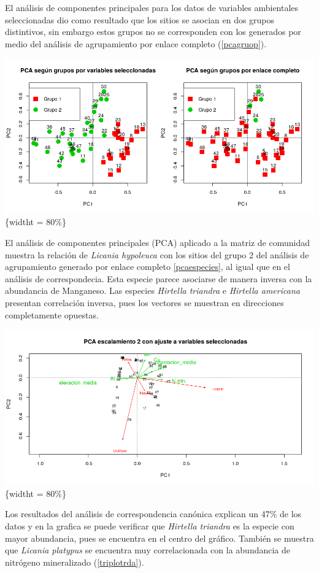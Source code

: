 \documentclass[11pt,]{article}
\begin{document}
El análisis de componentes principales para los datos de variables
ambientales seleccionadas dio como resultado que los sitios se asocian
en dos grupos distintivos, sin embargo estos grupos no se corresponden
con los generados por medio del análisis de agrupamiento por enlace
completo (\ref{pcagruop}).

\includegraphics{PCA_porgrupos.png}\{widtht = 80\%\}

El análisis de componentes principales (PCA) aplicado a la matriz de
comunidad muestra la relación de \emph{Licania hypoleuca} con los sitios
del grupo 2 del análisis de agrupamiento generado por enlace completo
\ref{pcaespecies}, al igual que en el análisis de correspondecia. Esta
especie parece asociarse de manera inversa con la abundancia de
Manganeso. Las especies \emph{Hirtella triandra} e \emph{Hirtella
americana} presentan correlación inversa, pues los vectores se muestran
en direcciones completamente opuestas.

\includegraphics{PCA_especies.png}\{widtht = 80\%\}

Los resultados del análisis de correspondencia canónica explican un 47\%
de los datos y en la grafica se puede verificar que \emph{Hirtella
triandra} es la especie con mayor abundancia, pues se encuentra en el
centro del gráfico. También se muestra que \emph{Licania platypus} se
encuentra muy correlacionada con la abundancia de nitrógeno mineralizado
(\ref{triplotrda}).
\end{document}
